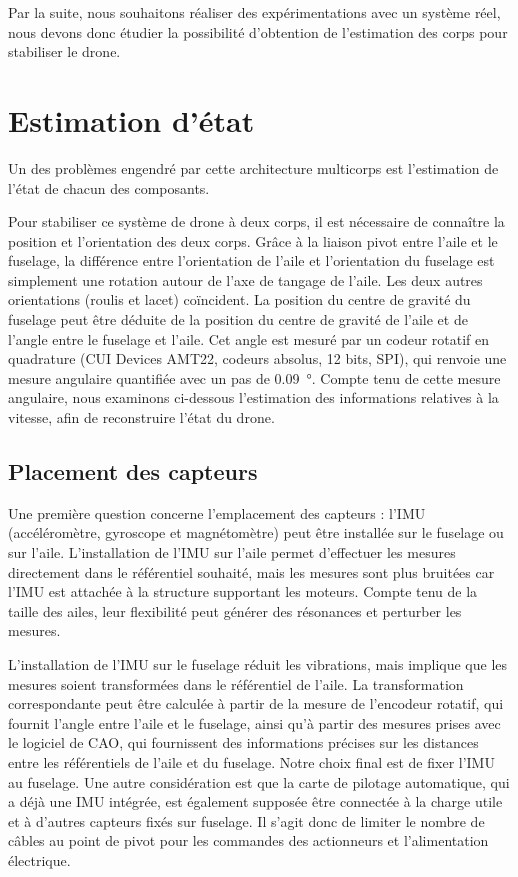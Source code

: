 {\color{blue}
    Par la suite, nous souhaitons réaliser des expérimentations avec un système réel, nous devons donc étudier la possibilité d'obtention de l'estimation des corps pour stabiliser le drone.
}






\section{Estimation d'état}\label{sec:stateEst}

{\color{blue}
    Un des problèmes engendré par cette architecture multicorps est l'estimation de l'état de chacun des composants.
}


Pour stabiliser ce système de drone à deux corps, il est nécessaire de connaître la position et l'orientation des deux corps. Grâce à la liaison pivot entre l'aile et le fuselage, la différence entre l'orientation de l'aile et l'orientation du fuselage est simplement une rotation autour de l'axe de tangage de l'aile. Les deux autres orientations (roulis et lacet) coïncident. La position du centre de gravité du fuselage peut être déduite de la position du centre de gravité de l'aile et de l'angle entre le fuselage et l'aile. Cet angle est mesuré par un codeur rotatif en quadrature (CUI Devices AMT22, codeurs absolus, 12 bits, SPI), qui renvoie une mesure angulaire quantifiée avec un pas de \SI{0,09}{\degree}. Compte tenu de cette mesure angulaire, nous examinons ci-dessous l'estimation des informations relatives à la vitesse, afin de reconstruire l'état du drone.

\subsection{Placement des capteurs}
\label{subsec:sens_pos}
Une première question concerne l'emplacement des capteurs : l'IMU (accéléromètre, gyroscope et magnétomètre) peut être installée sur le fuselage ou sur l'aile. 
L'installation de l'IMU sur l'aile permet d'effectuer les mesures directement dans le référentiel souhaité, mais les mesures sont plus bruitées car l'IMU est attachée à la structure supportant les moteurs. Compte tenu de la taille des ailes, leur flexibilité peut générer des résonances et perturber les mesures. 

L'installation de l'IMU sur le fuselage réduit les vibrations, mais implique que les mesures soient transformées dans le référentiel de l'aile. La transformation correspondante peut être calculée à partir de la mesure de l'encodeur rotatif, qui fournit l'angle entre l'aile et le fuselage, ainsi qu'à partir des mesures prises avec le logiciel de CAO, qui fournissent des informations précises sur les distances entre les référentiels de l'aile et du fuselage. Notre choix final est de fixer l'IMU au fuselage. Une autre considération est que la carte de pilotage automatique, qui a déjà une IMU intégrée, est également supposée être connectée à la charge utile et à d'autres capteurs fixés sur fuselage. Il s'agit donc de limiter le nombre de câbles au point de pivot pour les commandes des actionneurs et l'alimentation électrique.

